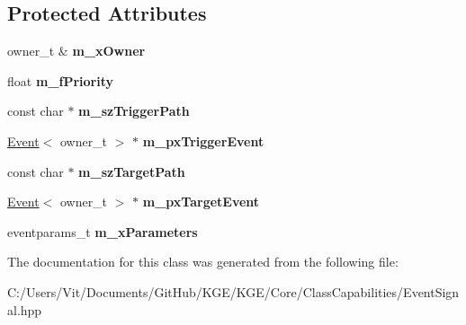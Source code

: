 \subsection*{Protected Attributes}
\begin{DoxyCompactItemize}
\item 
\hypertarget{class_k_g_e_1_1_event_signal_a40cc0e1308169ee30393e24636ea33c7}{owner\-\_\-t \& {\bfseries m\-\_\-x\-Owner}}\label{class_k_g_e_1_1_event_signal_a40cc0e1308169ee30393e24636ea33c7}

\item 
\hypertarget{class_k_g_e_1_1_event_signal_a24a350f8c112e8c578dc072e6a9054ca}{float {\bfseries m\-\_\-f\-Priority}}\label{class_k_g_e_1_1_event_signal_a24a350f8c112e8c578dc072e6a9054ca}

\item 
\hypertarget{class_k_g_e_1_1_event_signal_ae9ef131e2e10e146de7b72e2048424b2}{const char $\ast$ {\bfseries m\-\_\-sz\-Trigger\-Path}}\label{class_k_g_e_1_1_event_signal_ae9ef131e2e10e146de7b72e2048424b2}

\item 
\hypertarget{class_k_g_e_1_1_event_signal_a37e072a9c265912a8a602982440f128b}{\hyperlink{class_k_g_e_1_1_event}{Event}$<$ owner\-\_\-t $>$ $\ast$ {\bfseries m\-\_\-px\-Trigger\-Event}}\label{class_k_g_e_1_1_event_signal_a37e072a9c265912a8a602982440f128b}

\item 
\hypertarget{class_k_g_e_1_1_event_signal_a6732a2177dd72e19ed5222f4e7012392}{const char $\ast$ {\bfseries m\-\_\-sz\-Target\-Path}}\label{class_k_g_e_1_1_event_signal_a6732a2177dd72e19ed5222f4e7012392}

\item 
\hypertarget{class_k_g_e_1_1_event_signal_a717aff13f897a7acda5eeb59a5364d06}{\hyperlink{class_k_g_e_1_1_event}{Event}$<$ owner\-\_\-t $>$ $\ast$ {\bfseries m\-\_\-px\-Target\-Event}}\label{class_k_g_e_1_1_event_signal_a717aff13f897a7acda5eeb59a5364d06}

\item 
\hypertarget{class_k_g_e_1_1_event_signal_a4336b588f706964e78a4e54ad32a9165}{eventparams\-\_\-t {\bfseries m\-\_\-x\-Parameters}}\label{class_k_g_e_1_1_event_signal_a4336b588f706964e78a4e54ad32a9165}

\end{DoxyCompactItemize}


The documentation for this class was generated from the following file\-:\begin{DoxyCompactItemize}
\item 
C\-:/\-Users/\-Vit/\-Documents/\-Git\-Hub/\-K\-G\-E/\-K\-G\-E/\-Core/\-Class\-Capabilities/Event\-Signal.\-hpp\end{DoxyCompactItemize}
